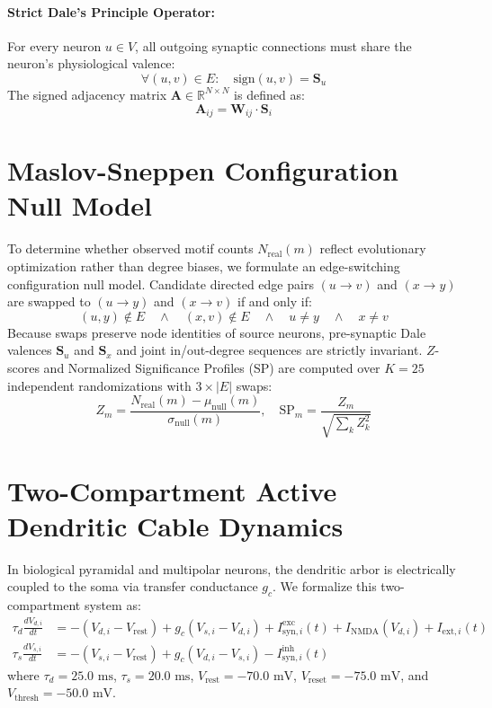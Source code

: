 \documentclass[11pt,letterpaper]{report}
\begin{document}
\paragraph{Strict Dale's Principle Operator:}
For every neuron $u \in V$, all outgoing synaptic connections must share the neuron's physiological valence:
\begin{equation}
\forall (u, v) \in E: \quad \mathrm{sign}(u, v) = \mathbf{S}_u
\end{equation}
The signed adjacency matrix $\mathbf{A} \in \mathbb{R}^{N \times N}$ is defined as:
\begin{equation}
\mathbf{A}_{ij} = \mathbf{W}_{ij} \cdot \mathbf{S}_i
\end{equation}

\section{Maslov-Sneppen Configuration Null Model}
To determine whether observed motif counts $N_{\mathrm{real}}(m)$ reflect evolutionary optimization rather than degree biases, we formulate an edge-switching configuration null model. Candidate directed edge pairs $(u \to v)$ and $(x \to y)$ are swapped to $(u \to y)$ and $(x \to v)$ if and only if:
\begin{equation}
(u, y) \notin E \quad \wedge \quad (x, v) \notin E \quad \wedge \quad u \neq y \quad \wedge \quad x \neq v
\end{equation}
Because swaps preserve node identities of source neurons, pre-synaptic Dale valences $\mathbf{S}_u$ and $\mathbf{S}_x$ and joint in/out-degree sequences are strictly invariant. $Z$-scores and Normalized Significance Profiles (SP) are computed over $K = 25$ independent randomizations with $3 \times |E|$ swaps:
\begin{equation}
Z_m = \frac{N_{\mathrm{real}}(m) - \mu_{\mathrm{null}}(m)}{\sigma_{\mathrm{null}}(m)}, \quad \mathrm{SP}_m = \frac{Z_m}{\sqrt{\sum_k Z_k^2}}
\end{equation}

\section{Two-Compartment Active Dendritic Cable Dynamics}
In biological pyramidal and multipolar neurons, the dendritic arbor is electrically coupled to the soma via transfer conductance $g_c$. We formalize this two-compartment system as:
\begin{align}
\tau_d \frac{dV_{d, i}}{dt} &= -(V_{d, i} - V_{\mathrm{rest}}) + g_c (V_{s, i} - V_{d, i}) + I_{\mathrm{syn}, i}^{\mathrm{exc}}(t) + I_{\mathrm{NMDA}}(V_{d, i}) + I_{\mathrm{ext}, i}(t) \\
\tau_s \frac{dV_{s, i}}{dt} &= -(V_{s, i} - V_{\mathrm{rest}}) + g_c (V_{d, i} - V_{s, i}) - I_{\mathrm{syn}, i}^{\mathrm{inh}}(t)
\end{align}
where $\tau_d = 25.0\text{ ms}$, $\tau_s = 20.0\text{ ms}$, $V_{\mathrm{rest}} = -70.0\text{ mV}$, $V_{\mathrm{reset}} = -75.0\text{ mV}$, and $V_{\mathrm{thresh}} = -50.0\text{ mV}$.
\end{document}
